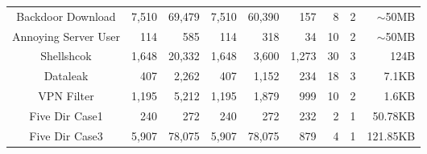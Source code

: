 \begin{table*}[!htb]
{\begin{tabular}{@{}crrrrrrrr@{}}
Backdoor Download    & 7,510                                             & 69,479                                            & 7,510                                    & 60,390                                    & 157                                   & 8                                       & 2                                        & $\sim$50MB                       \\
Annoying Server User & 114                                               & 585                                               & 114                                      & 318                                       & 34                                    & 10                                      & 2                                        & $\sim$50MB                       \\
Shellshcok           & 1,648                                             & 20,332                                            & 1,648                                    & 3,600                                     & 1,273                                 & 30                                      & 3                                        & 124B                             \\
Dataleak             & 407                                               & 2,262                                             & 407                                      & 1,152                                     & 234                                   & 18                                      & 3                                        & 7.1KB                            \\
VPN Filter           & 1,195                                             & 5,212                                             & 1,195                                    & 1,879                                     & 999                                   & 10                                      & 2                                        & 1.6KB                            \\
Five Dir Case1       & 240                                               & 272                                               & 240                                      & 272                                       & 232                                   & 2                                       & 1                                        & 50.78KB                          \\
Five Dir Case3       & 5,907                                             & 78,075                                            & 5,907                                    & 78,075                                    & 879                                   & 4                                       & 1                                        & 121.85KB                         \\

\end{tabular}}
\end{table*}
